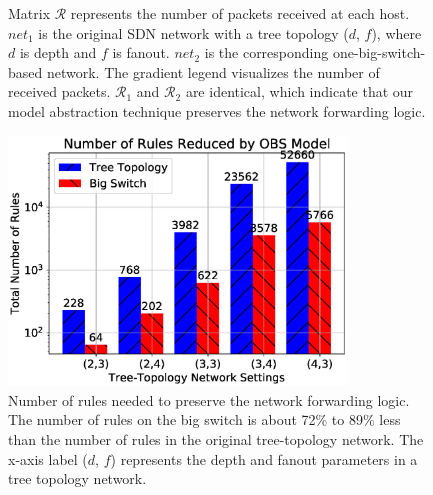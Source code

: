 \begin{figure}[t]
{                \label{OBS:Fig:PingMatrix4}
            }
        \caption[Forwarding Logic Evaluation after One-Big-Switch Abstraction]{
            Matrix $\mathcal{R}$ represents the number of packets received at each host.
        $net_1$ is the original SDN network with a tree topology ($d$, $f$),
        where $d$ is depth and $f$ is fanout.
        $net_2$ is the corresponding one-big-switch-based network.
        The gradient legend visualizes the number of received packets.
        $\mathcal{R}_1$ and $\mathcal{R}_2$ are identical,
        which indicate that our model abstraction technique preserves the network forwarding logic.}
    \label{OBS:Fig:ComparePingMatrix}
\end{figure}

\begin{figure}[t]
    \centering
    \includegraphics[width=0.8\textwidth]{OneBigSwitch/figures/comp_num_rules.eps}
    \caption[Number of Rules Reduced after One-Big-Switch Abstraction]{Number of rules needed to preserve the network forwarding logic.
        The number of rules on the big switch is about 72\% to 89\% less than
        the number of rules in the original tree-topology network.
        The x-axis label ($d$, $f$) represents the depth and fanout parameters
        in a tree topology network.}
    \label{OBS:Fig:CompareNumRules}
\end{figure}


